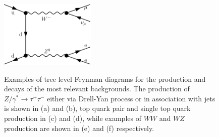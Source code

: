 \begin{figure}[tp]
\begin{center}
{            \includegraphics[height=3.2cm]{feyn_diagrams/diagrams/diboson2.pdf}
	}	
     \end{center}
    \caption{Examples of tree level Feynman diagrams for the production and decays of the most relevant backgrounds. The production of 
	 $Z/\gamma^* \rightarrow \tau^+ \tau^- $ either via Drell-Yan process or in association with jets  is shown in (a) and (b), top quark pair and
	single top quark production in (c) and (d), while examples of $WW$ and $WZ$ production are shown in (e) and (f) respectively.
	}
   \label{fig:feyndiagBack}
\end{figure}



